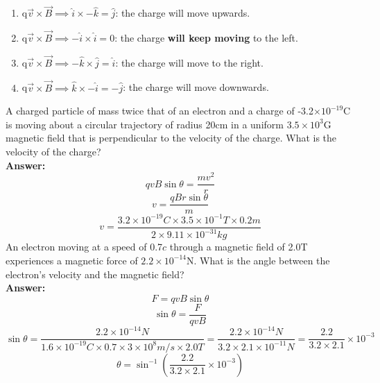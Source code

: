 \documentclass[9pt,addpoints]{exam}
\begin{document}
\begin{questions}
\begin{enumerate}[label=(\alph*)]
			\item q$\vec{v}\times\vec{B}\implies\hat{i}\times-\hat{k}=\hat{j}$: the charge will move upwards.
			\item q$\vec{v}\times\vec{B}\implies-\hat{i}\times\hat{i}=0$: the charge \textbf{will keep moving }to the left.
			\item q$\vec{v}\times\vec{B}\implies-\hat{k}\times\hat{j}=\hat{i}$: the charge will move to the right.
			\item q$\vec{v}\times\vec{B}\implies\hat{k}\times-\hat{i}=-\hat{j}$: the charge will move downwards.
		\end{enumerate}
		\question A charged particle of mass twice that of an electron and a charge of -3.2$\times10^{-19}$C is moving about a circular trajectory of radius 20cm in a uniform $3.5\times10^3$G magnetic field that is perpendicular to the velocity of the charge. What is the velocity of the charge? \\ \textbf{Answer:} \\ 
		$$qvB\sin\theta=\dfrac{mv^2}{r}$$
		$$v=\dfrac{qBr\sin\theta}{m}$$
		$$v=\dfrac{3.2\times10^{-19}C\times3.5\times10^{-1}T\times0.2m}{2\times9.11\times10^{-31}kg}$$
		\question An electron moving at a speed of 0.7$c$ through a magnetic field of 2.0T experiences a magnetic force of $2.2\times10^{-14}$N. What is the angle between the electron's velocity and the magnetic field? \\ \textbf{Answer:} \\ 
		$$F=qvB\sin\theta$$
		$$\sin\theta=\dfrac{F}{qvB}$$
		$$\sin\theta=\dfrac{2.2\times10^{-14}N}{1.6\times10^{-19}C\times0.7\times3\times10^8m/s\times2.0T}=\dfrac{2.2\times10^{-14}N}{3.2\times2.1\times10^{-11}N}=\dfrac{2.2}{3.2\times2.1}\times10^{-3}$$
		$$\theta=\sin^{-1}\left(\dfrac{2.2}{3.2\times2.1}\times10^{-3}\right)$$

\end{questions}
\end{document}
